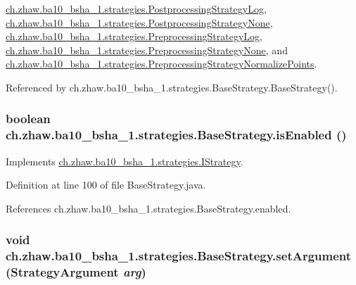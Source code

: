 \hyperlink{classch_1_1zhaw_1_1ba10__bsha__1_1_1strategies_1_1PostprocessingStrategyLog_af34bf152422d8a8ebc3540f317764e65}{ch.zhaw.ba10\_\-bsha\_\-1.strategies.PostprocessingStrategyLog}, \hyperlink{classch_1_1zhaw_1_1ba10__bsha__1_1_1strategies_1_1PostprocessingStrategyNone_afb92557a36f60e5b88cce17eddc688d9}{ch.zhaw.ba10\_\-bsha\_\-1.strategies.PostprocessingStrategyNone}, \hyperlink{classch_1_1zhaw_1_1ba10__bsha__1_1_1strategies_1_1PreprocessingStrategyLog_acac70ca9f34f19eb4f6a762895b2ffec}{ch.zhaw.ba10\_\-bsha\_\-1.strategies.PreprocessingStrategyLog}, \hyperlink{classch_1_1zhaw_1_1ba10__bsha__1_1_1strategies_1_1PreprocessingStrategyNone_a76d2204685b040adc9183d5ea705ef8c}{ch.zhaw.ba10\_\-bsha\_\-1.strategies.PreprocessingStrategyNone}, and \hyperlink{classch_1_1zhaw_1_1ba10__bsha__1_1_1strategies_1_1PreprocessingStrategyNormalizePoints_a933e6d434685d7273ddf132419f8738b}{ch.zhaw.ba10\_\-bsha\_\-1.strategies.PreprocessingStrategyNormalizePoints}.

Referenced by ch.zhaw.ba10\_\-bsha\_\-1.strategies.BaseStrategy.BaseStrategy().\hypertarget{classch_1_1zhaw_1_1ba10__bsha__1_1_1strategies_1_1BaseStrategy_ad8e0e57f59a0ca49b27f205a39f2b8ae}{
\subsubsection[{isEnabled}]{\setlength{\rightskip}{0pt plus 5cm}boolean ch.zhaw.ba10\_\-bsha\_\-1.strategies.BaseStrategy.isEnabled ()}}
\label{classch_1_1zhaw_1_1ba10__bsha__1_1_1strategies_1_1BaseStrategy_ad8e0e57f59a0ca49b27f205a39f2b8ae}


Implements \hyperlink{interfacech_1_1zhaw_1_1ba10__bsha__1_1_1strategies_1_1IStrategy_a64149a1aad4d39dde043d11b2e7cc673}{ch.zhaw.ba10\_\-bsha\_\-1.strategies.IStrategy}.

Definition at line 100 of file BaseStrategy.java.

References ch.zhaw.ba10\_\-bsha\_\-1.strategies.BaseStrategy.enabled.\hypertarget{classch_1_1zhaw_1_1ba10__bsha__1_1_1strategies_1_1BaseStrategy_ad1b20c8f3f41126c9e6cef52d3f30bbe}{
\subsubsection[{setArgument}]{\setlength{\rightskip}{0pt plus 5cm}void ch.zhaw.ba10\_\-bsha\_\-1.strategies.BaseStrategy.setArgument ({\bf StrategyArgument} {\em arg})}}
\label{classch_1_1zhaw_1_1ba10__bsha__1_1_1strategies_1_1BaseStrategy_ad1b20c8f3f41126c9e6cef52d3f30bbe}


